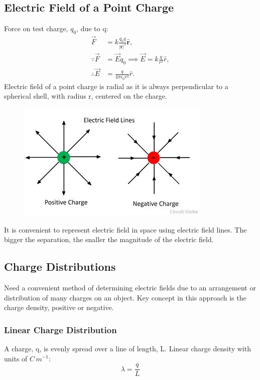 \documentclass[a4paper, 11pt, normalem]{report}
\begin{document}
\chapter{}
\section{Electric Field of a Point Charge}
Force on test charge, $q_{0}$, due to q:
\begin{align}
    \vec{F} &= k\frac{q_{0}q}{|\mathbf{r}|^{2}} \mathbf{\hat{r}}, \\
    \because \vec{F} &= \vec{E}q_{0} \implies \vec{E} = k\frac{q}{r^{2}}\hat{r}, \\ 
    \therefore \vec{E} &= \frac{q}{4\pi\epsilon_{0}r^{2}}\hat{r}.
\end{align}
Electric field of a point charge is radial as it is always perpendicular to a spherical shell, with radius r, centered on the charge.
\begin{figure}[H]
    \centering
    \includegraphics{electric-field-line.jpg}
\end{figure}
It is convenient to represent electric field in space using electric field lines. The bigger the separation, the snaller the magnitude of the electric field.

\section{Charge Distributions}
Need a convenient method of determining electric fields due to an arrangement or distribution of many charges on an object. 
Key concept in this approach is the charge density, positive or negative.

\subsection{Linear Charge Distribution}
A charge, q, is evenly spread over a line of length, L. 
Linear charge density with units of $C\,m^{-1}$:
\begin{equation}
    \lambda = \frac{q}{L}
\end{equation}
\end{document}
